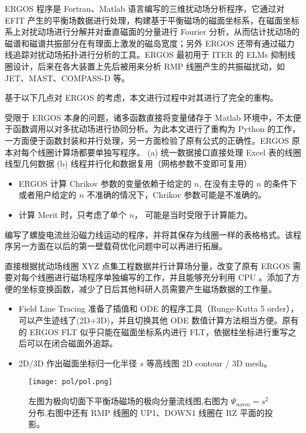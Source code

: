 ERGOS 程序是 Fortran、Matlab 语言编写的三维扰动场分析程序，它通过对 EFIT 产生的平衡场数据进行处理，构建基于平衡磁场的磁面坐标系，在磁面坐标系上对扰动场进行分解并对垂直磁面的分量进行 Fourier 分析，从而估计扰动场的磁谱和磁谱共振部分在有理面上激发的磁岛宽度；另外 ERGOS 还带有通过磁力线追踪对扰动场拓扑进行分析的工具。ERGOS 最初用于 ITER 的 ELMs 抑制线圈设计，后来在各大装置上先后被用来分析 RMP 线圈产生的共振磁扰动，如 JET、MAST、COMPASS-D 等。

基于以下几点对 ERGOS 的考虑，本文进行过程中对其进行了完全的重构。

受限于 ERGOS 本身的问题，诸多函数直接将变量储存于 Matlab 环境中，不太便于函数调用以对多扰动场进行协同分析。为此本文进行了重构为 Python 的工作，一方面便于函数封装和并行处理，另一方面检验了原有公式的正确性。ERGOS 原本对每个线圈计算场都要单独写程序。
  (a) 统一数据接口直接处理 Excel 表的线圈线型几何数据 (b) 线程并行化和数据复用（网格参数不变即可复用）
  

\begin{itemize}
  \item ERGOS 计算 Chrikov 参数的变量依赖于给定的 $n$, 在没有主导的 $n$ 的条件下或者用户给定的 $n$ 不准确的情况下，Chrikov 参数可能是不准确的。
  \item 计算 Merit 时，只考虑了单个 $n$， 可能是当时受限于计算能力。
\end{itemize}

编写了螺旋电流丝沿磁力线运动的程序，并将其保存为线圈一样的表格格式。该程序另一方面在以后的第一壁载荷优化问题中可以再进行拓展。


直接根据扰动场线圈 XYZ 点集工程数据并行计算场分量，改变了原有 ERGOS 需要对每个线圈进行磁场程序单独编写的工作，并且能够充分利用 CPU 。添加了方便的坐标变换函数，减少了日后其他科研人员需要产生磁场数据的工作量。


\begin{itemize}
  \item Field Line Tracing 准备了插值和 ODE 的程序工具（Runge-Kutta 5 order），可以产生迹线了(2D+3D)，并且切换其他 ODE 数值计算方法相当方便。原有的 ERGOS FLT 似乎只能在磁面坐标系内进行 FLT，依据柱坐标进行重写之后可以在闭合磁面外追踪。
  \item 2D/3D 作出磁面坐标归一化半径 $s$ 等高线图 2D contour / 3D mesh。
\end{itemize}


  



  
    

\begin{figure}[htbp]
    \centering%
        \texttt{[image: pol/pol.png]}
        \caption{左图为极向切面下平衡场磁场的极向分量流线图,右图为 $\Psi_{norm}=s^2$ 分布,右图中还有 RMP 线圈的 UP1、DOWN1 线圈在 RZ 平面的投影。}
\end{figure}




